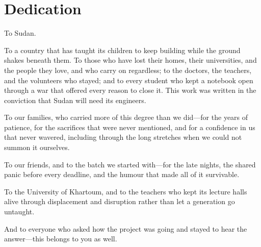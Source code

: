 \chapter*{Dedication}

To Sudan.

To a country that has taught its children to keep building while the ground shakes
beneath them. To those who have lost their homes, their universities, and the people
they love, and who carry on regardless; to the doctors, the teachers, and the
volunteers who stayed; and to every student who kept a notebook open through a war
that offered every reason to close it. This work was written in the conviction that
Sudan will need its engineers.

To our families, who carried more of this degree than we did---for the years of
patience, for the sacrifices that were never mentioned, and for a confidence in us
that never wavered, including through the long stretches when we could not summon it
ourselves.

To our friends, and to the batch we started with---for the late nights, the shared
panic before every deadline, and the humour that made all of it survivable.

To the University of Khartoum, and to the teachers who kept its lecture halls alive
through displacement and disruption rather than let a generation go untaught.

And to everyone who asked how the project was going and stayed to hear the
answer---this belongs to you as well.
